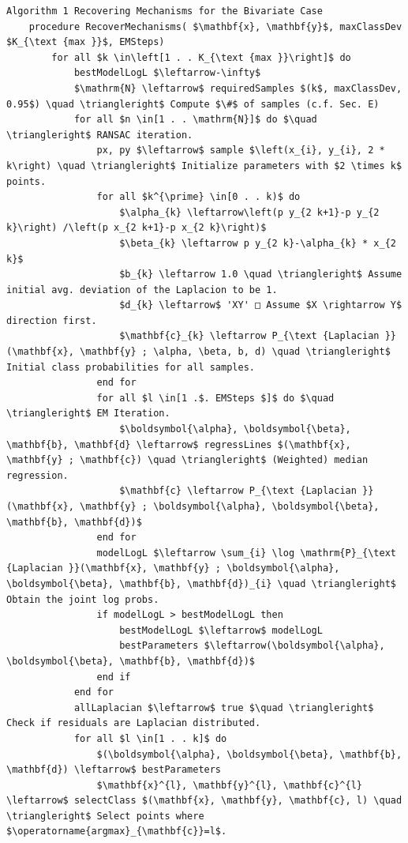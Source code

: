 \documentclass[10pt]{article}
\begin{document}
\begin{verbatim}
Algorithm 1 Recovering Mechanisms for the Bivariate Case
    procedure RecoverMechanisms( $\mathbf{x}, \mathbf{y}$, maxClassDev $K_{\text {max }}$, EMSteps)
        for all $k \in\left[1 . . K_{\text {max }}\right]$ do
            bestModelLogL $\leftarrow-\infty$
            $\mathrm{N} \leftarrow$ requiredSamples $(k$, maxClassDev, 0.95$) \quad \triangleright$ Compute $\#$ of samples (c.f. Sec. E)
            for all $n \in[1 . . \mathrm{N}]$ do $\quad \triangleright$ RANSAC iteration.
                px, py $\leftarrow$ sample $\left(x_{i}, y_{i}, 2 * k\right) \quad \triangleright$ Initialize parameters with $2 \times k$ points.
                for all $k^{\prime} \in[0 . . k)$ do
                    $\alpha_{k} \leftarrow\left(p y_{2 k+1}-p y_{2 k}\right) /\left(p x_{2 k+1}-p x_{2 k}\right)$
                    $\beta_{k} \leftarrow p y_{2 k}-\alpha_{k} * x_{2 k}$
                    $b_{k} \leftarrow 1.0 \quad \triangleright$ Assume initial avg. deviation of the Laplacion to be 1.
                    $d_{k} \leftarrow$ 'XY' □ Assume $X \rightarrow Y$ direction first.
                    $\mathbf{c}_{k} \leftarrow P_{\text {Laplacian }}(\mathbf{x}, \mathbf{y} ; \alpha, \beta, b, d) \quad \triangleright$ Initial class probabilities for all samples.
                end for
                for all $l \in[1 .$. EMSteps $]$ do $\quad \triangleright$ EM Iteration.
                    $\boldsymbol{\alpha}, \boldsymbol{\beta}, \mathbf{b}, \mathbf{d} \leftarrow$ regressLines $(\mathbf{x}, \mathbf{y} ; \mathbf{c}) \quad \triangleright$ (Weighted) median regression.
                    $\mathbf{c} \leftarrow P_{\text {Laplacian }}(\mathbf{x}, \mathbf{y} ; \boldsymbol{\alpha}, \boldsymbol{\beta}, \mathbf{b}, \mathbf{d})$
                end for
                modelLogL $\leftarrow \sum_{i} \log \mathrm{P}_{\text {Laplacian }}(\mathbf{x}, \mathbf{y} ; \boldsymbol{\alpha}, \boldsymbol{\beta}, \mathbf{b}, \mathbf{d})_{i} \quad \triangleright$ Obtain the joint log probs.
                if modelLogL > bestModelLogL then
                    bestModelLogL $\leftarrow$ modelLogL
                    bestParameters $\leftarrow(\boldsymbol{\alpha}, \boldsymbol{\beta}, \mathbf{b}, \mathbf{d})$
                end if
            end for
            allLaplacian $\leftarrow$ true $\quad \triangleright$ Check if residuals are Laplacian distributed.
            for all $l \in[1 . . k]$ do
                $(\boldsymbol{\alpha}, \boldsymbol{\beta}, \mathbf{b}, \mathbf{d}) \leftarrow$ bestParameters
                $\mathbf{x}^{l}, \mathbf{y}^{l}, \mathbf{c}^{l} \leftarrow$ selectClass $(\mathbf{x}, \mathbf{y}, \mathbf{c}, l) \quad \triangleright$ Select points where $\operatorname{argmax}_{\mathbf{c}}=l$.

\end{verbatim}
\end{document}
